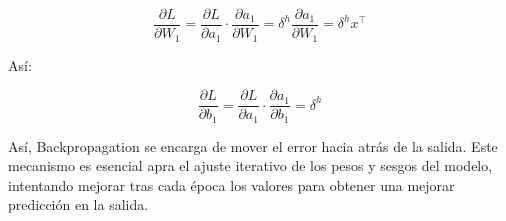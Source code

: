 \[
    \frac{\partial L}{\partial W_1} = \frac{\partial L}{\partial a_1} \cdot \frac{\partial a_1}{\partial W_1} = \delta^h \frac{\partial a_1}{\partial W_1} = \delta^h x^\top
\]

Así:

\[
    \frac{\partial L}{\partial b_1} = \frac{\partial L}{\partial a_1} \cdot \frac{\partial a_1}{\partial b_1} = \delta^h
\]

Así, Backpropagation se encarga de mover el error hacia atrás de la salida. Este mecanismo es esencial apra el ajuste
iterativo de los pesos y sesgos del modelo, intentando mejorar tras cada época los valores para obtener una mejorar
predicción en la salida.  


\clearpage